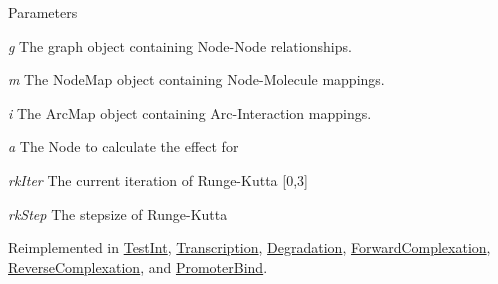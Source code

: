 \begin{DoxyParams}{Parameters}
\item[{\em g}]The graph object containing Node-\/Node relationships. \item[{\em m}]The NodeMap object containing Node-\/Molecule mappings. \item[{\em i}]The ArcMap object containing Arc-\/Interaction mappings. \item[{\em a}]The Node to calculate the effect for \item[{\em rkIter}]The current iteration of Runge-\/Kutta \mbox{[}0,3\mbox{]} \item[{\em rkStep}]The stepsize of Runge-\/Kutta \end{DoxyParams}


Reimplemented in \hyperlink{classTestInt_a7e6d8e60a2ebc357052a7776244893d7}{TestInt}, \hyperlink{classTranscription_a73f9e09dac4b601a297fd4d59c92cea5}{Transcription}, \hyperlink{classDegradation_a3cad4fc84026c6f627306a7e35527f3c}{Degradation}, \hyperlink{classForwardComplexation_a8f7f867b98b484ed0f09192ebd280e1a}{ForwardComplexation}, \hyperlink{classReverseComplexation_a9dceec2b67efbe7c14a7e53c959263f5}{ReverseComplexation}, and \hyperlink{classPromoterBind_afadb621f9976cc52d83caec0e8613244}{PromoterBind}.

